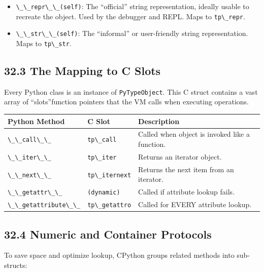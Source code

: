 \begin{itemize}
\tightlist
\item
  \passthrough{\lstinline!\_\_repr\_\_(self)!}: The ``official'' string
  representation, ideally usable to recreate the object. Used by the
  debugger and REPL. Maps to \passthrough{\lstinline!tp\_repr!}.
\item
  \passthrough{\lstinline!\_\_str\_\_(self)!}: The ``informal'' or
  user-friendly string representation. Maps to
  \passthrough{\lstinline!tp\_str!}.
\end{itemize}

\hypertarget{the-mapping-to-c-slots}{%
\subsection{32.3 The Mapping to C Slots}\label{the-mapping-to-c-slots}}

Every Python class is an instance of
\passthrough{\lstinline!PyTypeObject!}. This C struct contains a vast
array of ``slots''function pointers that the VM calls when executing
operations.

\begin{longtable}[]{@{}lll@{}}
\toprule
Python Method & C Slot & Description \\
\midrule
\endhead
\passthrough{\lstinline!\_\_call\_\_!} &
\passthrough{\lstinline!tp\_call!} & Called when object is invoked like
a function. \\
\passthrough{\lstinline!\_\_iter\_\_!} &
\passthrough{\lstinline!tp\_iter!} & Returns an iterator object. \\
\passthrough{\lstinline!\_\_next\_\_!} &
\passthrough{\lstinline!tp\_iternext!} & Returns the next item from an
iterator. \\
\passthrough{\lstinline!\_\_getattr\_\_!} &
\passthrough{\lstinline!(dynamic)!} & Called if attribute lookup
fails. \\
\passthrough{\lstinline!\_\_getattribute\_\_!} &
\passthrough{\lstinline!tp\_getattro!} & Called for EVERY attribute
lookup. \\
\bottomrule
\end{longtable}

\hypertarget{numeric-and-container-protocols}{%
\subsection{32.4 Numeric and Container
Protocols}\label{numeric-and-container-protocols}}

To save space and optimize lookup, CPython groups related methods into
sub-structs:


